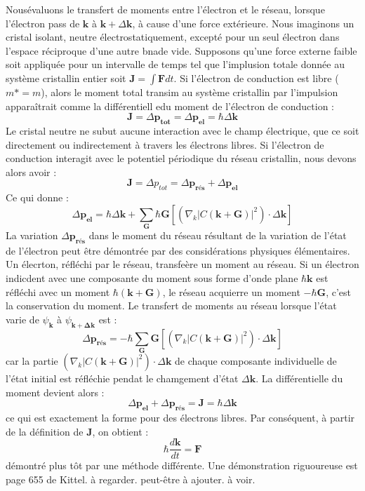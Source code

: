 Nousévaluons le transfert de moments entre l'électron et le réseau, lorsque
l'électron pass de $\mathbf{k}$ à $\mathbf{k}+\Delta\mathbf{k}$, à cause d'une
force extérieure. Nous imaginons un cristal isolant, neutre électrostatiquement,
excepté pour un seul électron dans l'espace réciproque d'une autre bnade vide.
Supposons qu'une force externe faible soit appliquée pour un intervalle de temps
tel que l'implusion totale donnée au système cristallin entier soit $\mathbf{J} =
\int \mathbf{F} dt$. Si l'électron de conduction est libre ($m*=m$), alors le
moment total transim au système cristallin par l'impulsion apparaîtrait comme la
différentiell edu moment de l'électron de conduction :
\begin{equation}
    \mathbf{J} = \Delta\mathbf{p_{tot}} = \Delta\mathbf{p_{el}} = \hbar \Delta
    \mathbf{k}
\end{equation}
Le cristal neutre ne subut aucune interaction avec le champ électrique, que ce
soit directement ou indirectement à travers les électrons libres.
Si l'électron de conduction interagit avec le potentiel périodique du réseau
cristallin, nous devons alors avoir :
\begin{equation}
    \mathbf{J} = \Delta{p_{tot}} = \Delta \mathbf{p_{rés}} +
    \Delta\mathbf{p_{el}}
\end{equation}
Ce qui donne :
\begin{equation}
    \Delta \mathbf{p_{el}} = \hbar \Delta \mathbf{k} + \sum_\mathbf{G}
    \hbar\mathbf{G}[(\nabla_k|C(\mathbf{k+G})|^2)\cdot\Delta\mathbf{k}]
\end{equation}
La variation $\Delta \mathbf{p_{rés}}$ dans le moment du réseau résultant de la
variation de l'état de l'électron peut être démontrée par des considérations
physiques élémentaires. Un élecrton, réfléchi par le réseau, transfeère un moment
au réseau. Si un électron indicdent avec une composante du moment sous forme
d'onde plane $\hbar \mathbf{k}$ est réfléchi avec un moment
$\hbar(\mathbf{k+G})$, le réseau acquierre un moment $-\hbar \mathbf{G}$, c'est
la conservation du moment. Le transfert de moments au réseau lorsque l'état varie
de $\psi_\mathbf{k}$ à $\psi_{\mathbf{k+\Delta k}}$ est :
\begin{equation}
    \Delta \mathbf{p_{rés}} = -\hbar \sum_\mathbf{G}
    \mathbf{G}[(\nabla_k|C(\mathbf{k+G})|^2)\cdot\Delta\mathbf{k}]
\end{equation}
car la partie $(\nabla_k|C(\mathbf{k+G})|^2)\cdot\Delta\mathbf{k}$ de chaque
composante individuelle de l'état initial est réfléchie pendat le chamgement
d'état $\Delta \mathbf{k}$. La différentielle du moment devient alors :
\begin{equation}
    \Delta \mathbf{p_{el}} + \Delta \mathbf{p_{rés}} = \mathbf{J} = \hbar \Delta
    \mathbf{k}
\end{equation}
ce qui est exactement la forme pour des électrons libres. Par conséquent, à
partir de la définition de $\mathbf{J}$, on obtient :
\begin{equation}
    \hbar \frac{d\mathbf{k}}{dt} = \mathbf{F}
\end{equation}
démontré plus tôt par une méthode différente. Une démonstration riguoureuse est
page 655 de Kittel. à regarder. peut-être à ajouter. à voir.

